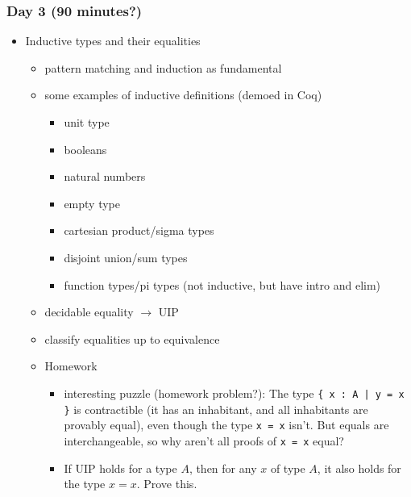 \documentclass{article}
\begin{document}
\subsubsection*{Day 3 (90 minutes?)}
\begin{itemize}
  \item Inductive types and their equalities
    \begin{itemize}
      \item pattern matching and induction as fundamental
      \item some examples of inductive definitions (demoed in Coq)
      \begin{itemize}
        \item unit type
        \item booleans
        \item natural numbers
        \item empty type
        \item cartesian product/sigma types
        \item disjoint union/sum types
        \item function types/pi types (not inductive, but have intro and elim)
      \end{itemize}
      \item decidable equality $\to$ UIP
      \item classify equalities up to equivalence
      \item Homework
        \begin{itemize}
          \item
            interesting puzzle (homework problem?): The type \texttt{\{ x : A | y = x \}} is contractible (it has an inhabitant, and all inhabitants are provably equal), even though the type \texttt{x = x} isn't.  But equals are interchangeable, so why aren't all proofs of \texttt{x = x} equal?
          \item
            If UIP holds for a type $A$, then for any $x$ of type $A$, it also holds for the type $x = x$.  Prove this.
        \end{itemize}
      \end{itemize}
\end{itemize}
\end{document}
